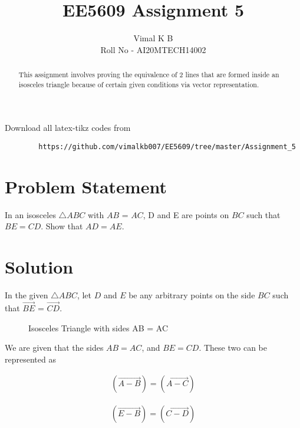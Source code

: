 \documentclass[journal,12pt,twocolumn]{IEEEtran}
\begin{document}
	
	
	\title{EE5609 Assignment 5}
	\author{Vimal K B \\Roll No - AI20MTECH14002}
	
	\maketitle
	\newpage
	\bigskip
	
	\renewcommand{\thefigure}{\theenumi}
	\renewcommand{\thetable}{\theenumi}
	
	\begin{abstract}
		This assignment involves proving the equivalence of 2 lines that are formed inside an isosceles triangle because of certain given conditions via vector representation.
	\end{abstract}

	Download all latex-tikz codes from 
	
	\begin{lstlisting}
		https://github.com/vimalkb007/EE5609/tree/master/Assignment_5
	\end{lstlisting}
	
	\section{Problem Statement}
In an isosceles $\triangle ABC$ with $AB$ = $AC$, D and E are points on $BC$ such that $BE = CD$. Show that $AD = AE$. 
	\section{Solution}
	
	In the given  $\triangle ABC$, let $D$ and $E$ be any arbitrary points on the side $BC$ such that $\vec{BE}$ = $\vec{CD}$.
	
	\renewcommand{\thefigure}{1}
	\begin{figure}[!ht] \label{fig:two_triangles}
		\centering
		\resizebox{\columnwidth}{!}{}
		\caption{Isosceles Triangle with sides AB = AC}
	\end{figure}
	
	We are given that the sides $AB = AC$, and $BE = CD$. These two can be represented as
	
	\begin{align}\label{eq:fact1}
		(\vec{A-B}) = (\vec{A-C})
	\end{align}

	\begin{align}\label{eq:fact2}
		(\vec{E-B}) = (\vec{C-D})
	\end{align}
	
\end{document}
